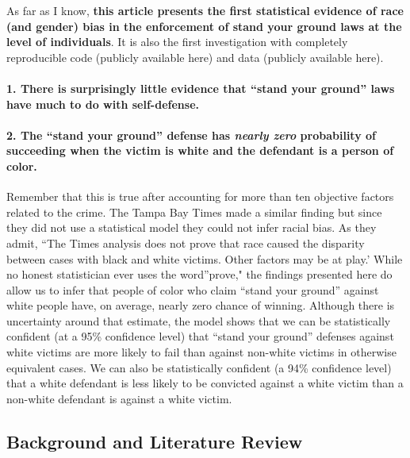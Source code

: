\documentclass[12pt,article]{article}
\begin{document}
As far as I know, \textbf{this article presents the first statistical
evidence of race (and gender) bias in the enforcement of stand your
ground laws at the level of individuals}. It is also the first
investigation with completely reproducible code (publicly available
here) and data (publicly available here).

\paragraph{1. There is surprisingly little evidence that ``stand your
ground'' laws have much to do with
self-defense.}\label{there-is-surprisingly-little-evidence-that-stand-your-ground-laws-have-much-to-do-with-self-defense.}

\paragraph{2. The ``stand your ground'' defense has \emph{nearly zero}
probability of succeeding when the victim is white and the defendant is
a person of
color.}\label{the-stand-your-ground-defense-has-nearly-zero-probability-of-succeeding-when-the-victim-is-white-and-the-defendant-is-a-person-of-color.}

Remember that this is true after accounting for more than ten objective
factors related to the crime. The Tampa Bay Times made a similar finding
but since they did not use a statistical model they could not infer
racial bias. As they admit, ``The Times analysis does not prove that
race caused the disparity between cases with black and white victims.
Other factors may be at play.' While no honest statistician ever uses
the word''prove," the findings presented here do allow us to infer that
people of color who claim ``stand your ground'' against white people
have, on average, nearly zero chance of winning. Although there is
uncertainty around that estimate, the model shows that we can be
statistically confident (at a 95\% confidence level) that ``stand your
ground'' defenses against white victims are more likely to fail than
against non-white victims in otherwise equivalent cases. We can also be
statistically confident (a 94\% confidence level) that a white defendant
is less likely to be convicted against a white victim than a non-white
defendant is against a white victim.

\subsection{Background and Literature
Review}\label{background-and-literature-review}
\end{document}
